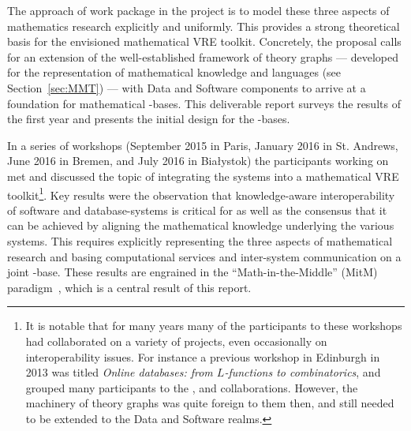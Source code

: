 The approach of work package  in the \pn project is to model these three
aspects of mathematics research explicitly and uniformly.
This provides a strong theoretical basis for the envisioned mathematical
VRE toolkit. Concretely, the \pn proposal calls for an extension of the well-established
framework of theory graphs --- developed for the representation of mathematical knowledge
and languages (see Section~\ref{sec:MMT}) --- with Data and Software components to arrive
at a foundation for mathematical \DKS-bases. This deliverable report surveys
the results of the first year and presents the initial design for the
\DKS-bases.

In a series of workshops (September 2015 in Paris, January 2016 in St. Andrews, June 2016
in Bremen, and July 2016 in Bia{\l}ystok) the participants working on  met
and discussed the topic of integrating the \pn systems into a mathematical VRE toolkit\footnote{It is notable that  for many years many of the participants to these workshops had collaborated on a variety of projects, even occasionally on interoperability issues. For instance a previous workshop in Edinburgh in 2013 was titled \emph{Online databases: from $L$-functions to combinatorics}, and grouped many participants to the \SageMath, \FindStat and \LMFDB collaborations. However, the machinery of theory graphs was quite foreign to them then, and still needed to be extended to the Data and Software realms.}.
Key results were the observation that knowledge-aware interoperability of software and
database-systems is critical for \pn as well as the consensus that it can be achieved by
aligning the mathematical knowledge underlying the various systems.  This requires
explicitly representing the three aspects of mathematical research and basing
computational services and inter-system communication on a joint \DKS-base.  These results
are engrained in the ``Math-in-the-Middle'' (MitM) paradigm~\cite{DehKohKon:iop16}, which
is a central result of this report.

